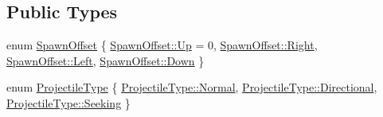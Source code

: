 \subsection*{Public Types}
\begin{DoxyCompactItemize}
\item 
enum \hyperlink{classZeta_1_1ProjectileClass_a724c4a052d876f0b7ea61719cd020e46}{Spawn\+Offset} \{ \hyperlink{classZeta_1_1ProjectileClass_a724c4a052d876f0b7ea61719cd020e46a258f49887ef8d14ac268c92b02503aaa}{Spawn\+Offset\+::\+Up} = 0, 
\hyperlink{classZeta_1_1ProjectileClass_a724c4a052d876f0b7ea61719cd020e46a92b09c7c48c520c3c55e497875da437c}{Spawn\+Offset\+::\+Right}, 
\hyperlink{classZeta_1_1ProjectileClass_a724c4a052d876f0b7ea61719cd020e46a945d5e233cf7d6240f6b783b36a374ff}{Spawn\+Offset\+::\+Left}, 
\hyperlink{classZeta_1_1ProjectileClass_a724c4a052d876f0b7ea61719cd020e46a08a38277b0309070706f6652eeae9a53}{Spawn\+Offset\+::\+Down}
 \}
\item 
enum \hyperlink{classZeta_1_1ProjectileClass_ae4d46651595803ab0093180758ca94b0}{Projectile\+Type} \{ \hyperlink{classZeta_1_1ProjectileClass_ae4d46651595803ab0093180758ca94b0a960b44c579bc2f6818d2daaf9e4c16f0}{Projectile\+Type\+::\+Normal}, 
\hyperlink{classZeta_1_1ProjectileClass_ae4d46651595803ab0093180758ca94b0ab04a8341537fac392bfd17776491d03c}{Projectile\+Type\+::\+Directional}, 
\hyperlink{classZeta_1_1ProjectileClass_ae4d46651595803ab0093180758ca94b0adfa6bb51bca02efb16d45113cd76c1f4}{Projectile\+Type\+::\+Seeking}
 \}
\end{DoxyCompactItemize}
